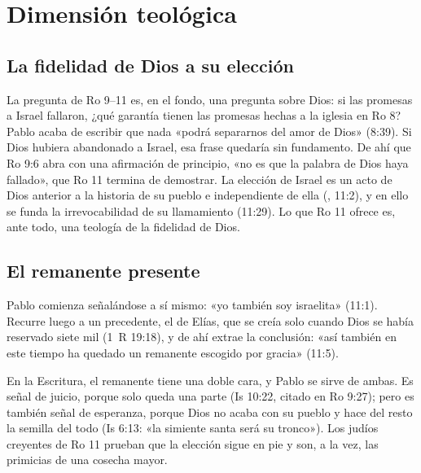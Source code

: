 \section{Dimensión teológica}

\subsection{La fidelidad de Dios a su elección}
La pregunta de Ro 9--11 es, en el fondo, una pregunta sobre Dios: si las promesas a Israel fallaron, ¿qué garantía tienen las promesas hechas a la iglesia en Ro 8? Pablo acaba de escribir que nada «podrá separarnos del amor de Dios» (8:39). Si Dios hubiera abandonado a Israel, esa frase quedaría sin fundamento. De ahí que Ro 9:6 abra con una afirmación de principio, «no es que la palabra de Dios haya fallado», que Ro 11 termina de demostrar. La elección de Israel es un acto de Dios anterior a la historia de su pueblo e independiente de ella (, 11:2), y en ello se funda la irrevocabilidad de su llamamiento (11:29). Lo que Ro 11 ofrece es, ante todo, una teología de la fidelidad de Dios.

\subsection{El remanente presente}
Pablo comienza señalándose a sí mismo: «yo también soy israelita» (11:1). Recurre luego a un precedente, el de Elías, que se creía solo cuando Dios se había reservado siete mil (1~R 19:18), y de ahí extrae la conclusión: «así también en este tiempo ha quedado un remanente escogido por gracia» (11:5).

En la Escritura, el remanente tiene una doble cara, y Pablo se sirve de ambas. Es señal de juicio, porque solo queda una parte (Is 10:22, citado en Ro 9:27); pero es también señal de esperanza, porque Dios no acaba con su pueblo y hace del resto la semilla del todo (Is 6:13: «la simiente santa será su tronco»). Los judíos creyentes de Ro 11 prueban que la elección sigue en pie y son, a la vez, las primicias de una cosecha mayor.


